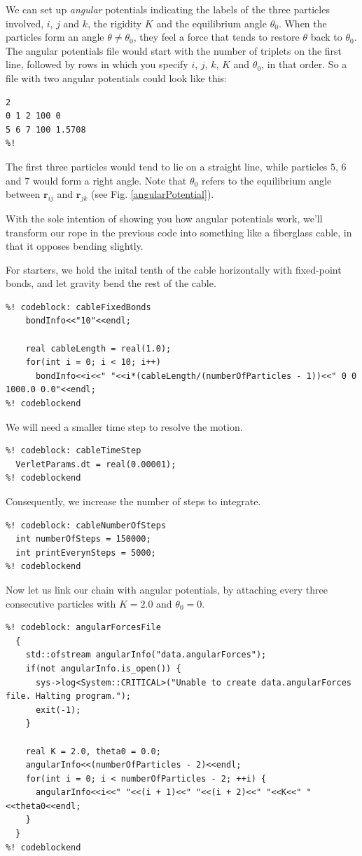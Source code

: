 We can set up \textit{angular} potentials indicating the labels of the three 
particles involved, $i$, $j$ and $k$, the rigidity $K$ and the equilibrium angle 
$\theta_0$. When the particles form an angle $\theta \neq \theta_0$, they feel a 
force that tends to restore $\theta$ back to $\theta_0$. The angular potentials 
file would start with the number of triplets on the first line, followed by rows 
in which you specify $i$, $j$, $k$, $K$ and $\theta_0$, in that order. So a file 
with two angular potentials could look like this:
\begin{lstlisting}
2
0 1 2 100 0
5 6 7 100 1.5708
%!
\end{lstlisting}
The first three particles would tend to lie on a straight line, while particles 
$5$, $6$ and $7$ would form a right angle. Note that $\theta_0$ refers to the 
equilibrium angle between $\mathbf{r}_{ij}$ and $\mathbf{r}_{jk}$ (see Fig. 
\ref{angularPotential}).

With the sole intention of showing you how angular potentials work, we'll 
transform our rope in the previous code into something like a fiberglass cable, 
in that it opposes bending slightly.

For starters, we hold the inital tenth of the cable horizontally with
fixed-point bonds, and let gravity bend the rest of the cable.
\begin{lstlisting}
%! codeblock: cableFixedBonds
    bondInfo<<"10"<<endl;

    real cableLength = real(1.0);
    for(int i = 0; i < 10; i++)
      bondInfo<<i<<" "<<i*(cableLength/(numberOfParticles - 1))<<" 0 0 1000.0 0.0"<<endl;
%! codeblockend
\end{lstlisting}
We will need a smaller time step to resolve the motion.
\begin{lstlisting}
%! codeblock: cableTimeStep
  VerletParams.dt = real(0.00001);
%! codeblockend
\end{lstlisting}
Consequently, we increase the number of steps to integrate.
\begin{lstlisting}
%! codeblock: cableNumberOfSteps
  int numberOfSteps = 150000;
  int printEverynSteps = 5000;
%! codeblockend
\end{lstlisting}

Now let us link our chain with angular potentials, by attaching every three
consecutive particles with $K = 2.0$ and $\theta_0 = 0$.
\begin{lstlisting}
%! codeblock: angularForcesFile
  {
    std::ofstream angularInfo("data.angularForces");
    if(not angularInfo.is_open()) {
      sys->log<System::CRITICAL>("Unable to create data.angularForces file. Halting program.");
      exit(-1);
    }

    real K = 2.0, theta0 = 0.0;
    angularInfo<<(numberOfParticles - 2)<<endl;
    for(int i = 0; i < numberOfParticles - 2; ++i) {
      angularInfo<<i<<" "<<(i + 1)<<" "<<(i + 2)<<" "<<K<<" "<<theta0<<endl;
    }
  }
%! codeblockend
\end{lstlisting}

